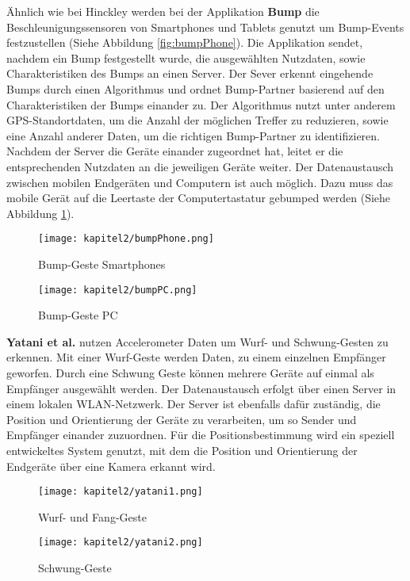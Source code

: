 Ähnlich wie bei Hinckley werden bei der Applikation \textbf{Bump} \cite{Bump:Online} die Beschleunigungssensoren von Smartphones und Tablets genutzt um Bump-Events festzustellen (Siehe Abbildung \ref{fig:bumpPhone}). Die Applikation sendet, nachdem ein Bump festgestellt wurde, die ausgewählten Nutzdaten, sowie Charakteristiken des Bumps an einen Server. Der Sever erkennt eingehende Bumps durch einen Algorithmus und ordnet Bump-Partner basierend auf den Charakteristiken der Bumps einander zu. Der Algorithmus nutzt unter anderem GPS-Standortdaten, um die Anzahl der möglichen Treffer zu reduzieren, sowie eine Anzahl anderer Daten, um die richtigen Bump-Partner zu identifizieren. Nachdem der Server die Geräte einander zugeordnet hat, leitet er die entsprechenden Nutzdaten an die jeweiligen Geräte weiter. Der Datenaustausch zwischen mobilen Endgeräten und Computern ist auch möglich. Dazu muss das mobile Gerät auf die Leertaste der Computertastatur gebumped werden (Siehe Abbildung \ref{fig:bumpPC}).

\begin{figure}[H]
\begin{minipage}[h]{7cm}
	\centering
	\texttt{[image: kapitel2/bumpPhone.png]}
	\caption{Bump-Geste Smartphones \cite{BumpPicPhone:Online}}
	\label{fig:bumpPhone}
\end{minipage}
\hfill
\begin{minipage}[h]{7cm}
	\centering
	\texttt{[image: kapitel2/bumpPC.png]}
	\caption{Bump-Geste PC \cite{Bump:Online}}
	\label{fig:bumpPC}
\end{minipage}
\end{figure}

\textbf{Yatani et al.} \cite{Yatani:2006:TII:1184855.1184874} nutzen Accelerometer Daten um Wurf- und Schwung-Gesten zu erkennen. Mit einer Wurf-Geste werden Daten, zu einem einzelnen Empfänger geworfen. Durch eine Schwung Geste können mehrere Geräte auf einmal als Empfänger ausgewählt werden. Der Datenaustausch erfolgt über einen Server in einem lokalen \acs{WLAN}-Netzwerk. Der Server ist ebenfalls dafür zuständig, die Position und Orientierung der Geräte zu verarbeiten, um so Sender und Empfänger einander zuzuordnen. Für die Positionsbestimmung wird ein speziell entwickeltes System genutzt, mit dem die Position und Orientierung der Endgeräte über eine Kamera erkannt wird.

\begin{figure}[H]
\begin{minipage}[h]{7cm}
	\centering
	\texttt{[image: kapitel2/yatani1.png]}
	\caption{Wurf- und Fang-Geste \cite{Yatani:2006:TII:1184855.1184874}}
	\label{fig:yatani1}
\end{minipage}
\hfill
\begin{minipage}[h]{7cm}
	\centering
	\texttt{[image: kapitel2/yatani2.png]}
	\caption{Schwung-Geste \cite{Yatani:2006:TII:1184855.1184874}}
	\label{fig:yatani2}
\end{minipage}
\end{figure}

